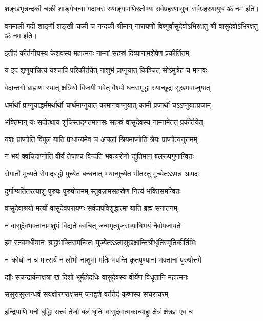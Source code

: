 \twolineshloka
{शङ्खभृन्नन्दकी चक्री शार्ङ्गधन्वा गदाधरः}
{रथाङ्गपाणिरक्षोभ्यः सर्वप्रहरणायुधः}
सर्वप्रहरणायुध ॐ नम इति।

\twolineshloka
{वनमाली गदी शार्ङ्गी शङ्खी चक्री च नन्दकी}
{श्रीमान् नारायणो विष्णुर्वासुदेवोऽभिरक्षतु}%
श्री वासुदेवोऽभिरक्षतु ॐ नम इति।

\resetShloka
\twolineshloka
{इतीदं कीर्तनीयस्य केशवस्य महात्मनः}
{नाम्नां सहस्रं दिव्यानामशेषेण प्रकीर्तितम्}

\twolineshloka
{य इदं शृणुयान्नित्यं यश्चापि परिकीर्तयेत्}
{नाशुभं प्राप्नुयात् किञ्चित् सोऽमुत्रेह च मानवः}

\twolineshloka
{वेदान्तगो ब्राह्मणः स्यात् क्षत्रियो विजयी भवेत्}
{वैश्यो धनसमृद्धः स्याच्छूद्रः सुखमवाप्नुयात्}

\twolineshloka
{धर्मार्थी प्राप्नुयाद्धर्ममर्थार्थी चार्थमाप्नुयात्}
{कामानवाप्नुयात् कामी प्रजार्थी चऽऽप्नुयात्प्रजाम्}

\twolineshloka
{भक्तिमान् यः सदोत्थाय शुचिस्तद्गतमानसः}
{सहस्रं वासुदेवस्य नाम्नामेतत् प्रकीर्तयेत्}

\twolineshloka
{यशः प्राप्नोति विपुलं याति प्राधान्यमेव च}
{अचलां श्रियमाप्नोति श्रेयः प्राप्नोत्यनुत्तमम्}

\twolineshloka
{न भयं क्वचिदाप्नोति वीर्यं तेजश्च विन्दति}
{भवत्यरोगो द्युतिमान् बलरूपगुणान्वितः}

\twolineshloka
{रोगार्तो मुच्यते रोगाद्बद्धो मुच्येत बन्धनात्}
{भयान्मुच्येत भीतस्तु मुच्येतऽऽपन्न आपदः}

\twolineshloka
{दुर्गाण्यतितरत्याशु पुरुषः पुरुषोत्तमम्}
{स्तुवन्नामसहस्रेण नित्यं भक्तिसमन्वितः}

\twolineshloka
{वासुदेवाश्रयो मर्त्यो वासुदेवपरायणः}
{सर्वपापविशुद्धात्मा याति ब्रह्म सनातनम्}

\twolineshloka
{न वासुदेवभक्तानामशुभं विद्यते क्वचित्}
{जन्ममृत्युजराव्याधिभयं नैवोपजायते}

\twolineshloka
{इमं स्तवमधीयानः श्रद्धाभक्तिसमन्वितः}
{युज्येतऽऽत्मसुखक्षान्तिश्रीधृतिस्मृतिकीर्तिभिः}

\twolineshloka
{न क्रोधो न च मात्सर्यं न लोभो नाशुभा मतिः}
{भवन्ति कृतपुण्यानां भक्तानां पुरुषोत्तमे}

\twolineshloka
{द्यौः सचन्द्रार्कनक्षत्रा खं दिशो भूर्महोदधिः}
{वासुदेवस्य वीर्येण विधृतानि महात्मनः}

\twolineshloka
{ससुरासुरगन्धर्वं सयक्षोरगराक्षसम्}
{जगद्वशे वर्ततेदं कृष्णस्य सचराचरम्}

\twolineshloka
{इन्द्रियाणि मनो बुद्धिः सत्त्वं तेजो बलं धृतिः}
{वासुदेवात्मकान्याहुः क्षेत्रं क्षेत्रज्ञ एव च}

